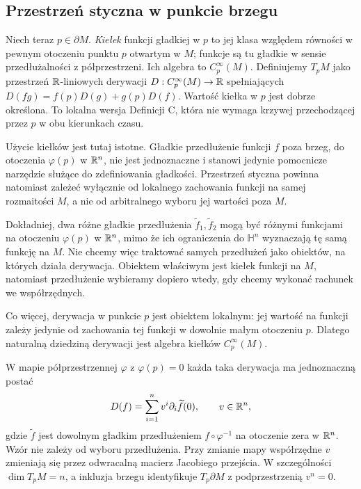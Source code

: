 \subsection*{Przestrzeń styczna w punkcie brzegu}

Niech teraz $p\in\partial M$. \emph{Kiełek} funkcji gładkiej w $p$
to jej klasa względem równości w pewnym otoczeniu punktu $p$
otwartym w $M$;
funkcje są tu gładkie w sensie przedłużalności z półprzestrzeni.
Ich algebra to $C^\infty_p(M)$. Definiujemy $T_pM$ jako przestrzeń
$\mathbb{R}$-liniowych derywacji $D:C^\infty_p(M)\to\mathbb{R}$ spełniających $D(fg)=f(p)D(g)+g(p)D(f)$.
Wartość kiełka w $p$ jest dobrze określona. To lokalna wersja
Definicji C, która nie wymaga krzywej przechodzącej przez $p$
w obu kierunkach czasu.

Użycie kiełków jest tutaj istotne. Gładkie przedłużenie funkcji
$f$ poza brzeg, do otoczenia $\varphi(p)$ w $\mathbb{R}^n$, nie jest
jednoznaczne i stanowi jedynie pomocnicze narzędzie służące do
zdefiniowania gładkości. Przestrzeń styczna powinna natomiast zależeć
wyłącznie od lokalnego zachowania funkcji na samej rozmaitości $M$,
a nie od arbitralnego wyboru jej wartości poza $M$.

Dokładniej, dwa różne gładkie przedłużenia
$\widetilde f_1,\widetilde f_2$ mogą być różnymi funkcjami na
otoczeniu $\varphi(p)$ w $\mathbb{R}^n$, mimo że ich ograniczenia do
$\mathbb H^n$ wyznaczają tę samą funkcję na $M$. Nie chcemy więc
traktować samych przedłużeń jako obiektów, na których działa derywacja.
Obiektem właściwym jest kiełek funkcji na $M$, natomiast przedłużenie
wybieramy dopiero wtedy, gdy chcemy wykonać rachunek we współrzędnych.

Co więcej, derywacja w punkcie $p$ jest obiektem lokalnym: jej wartość
na funkcji zależy jedynie od zachowania tej funkcji w dowolnie małym
otoczeniu $p$. Dlatego naturalną dziedziną derywacji jest algebra
kiełków $C^\infty_p(M)$.

\begin{stwierdzenie}
\label{prop:styczna-brzeg-1}
W mapie półprzestrzennej $\varphi$ z $\varphi(p)=0$ każda taka
derywacja ma jednoznaczną postać
\[
D(f)=\sum_{i=1}^n v^i\partial_i\widetilde f(0),
\qquad v\in\mathbb{R}^n,
\]
gdzie $\widetilde f$ jest dowolnym gładkim przedłużeniem
$f\circ\varphi^{-1}$ na otoczenie zera w $\mathbb{R}^n$.
Wzór nie zależy od wyboru przedłużenia. Przy zmianie mapy współrzędne
$v$ zmieniają się przez odwracalną macierz Jacobiego przejścia.
W szczególności $\dim T_pM=n$, a inkluzja brzegu identyfikuje
$T_p\partial M$ z podprzestrzenią $v^n=0$.
\end{stwierdzenie}

